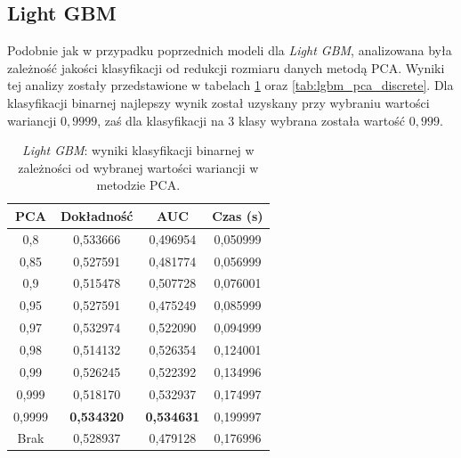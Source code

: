 \documentclass[a4paper, twoside, 11pt, openright]{article}
\begin{document}
\subsection{Light GBM}

Podobnie jak w przypadku poprzednich modeli dla \textit{Light GBM}, analizowana była zależność jakości klasyfikacji od redukcji rozmiaru danych metodą PCA. Wyniki tej analizy zostały przedstawione w tabelach \ref{tab:lgbm_pca_binary} oraz \ref{tab:lgbm_pca_discrete}. Dla klasyfikacji binarnej najlepszy wynik został uzyskany przy wybraniu wartości wariancji $0,9999$, zaś dla klasyfikacji na 3 klasy wybrana została wartość $0,999$.

\begin{table}[H]
    \centering
    \begin{tabular}{|c|c|c|c|}
    \hline
        \textbf{PCA} & \textbf{Dokładność} & \textbf{AUC} & \textbf{Czas (s)} \\ \hline
0,8                &  0,533666 &  0,496954 &    0,050999 \\ \hline
0,85               &  0,527591 &  0,481774 &    0,056999 \\ \hline
0,9                &  0,515478 &  0,507728 &    0,076001 \\ \hline
0,95               &  0,527591 &  0,475249 &    0,085999 \\ \hline
0,97               &  0,532974 &  0,522090 &    0,094999 \\ \hline
0,98               &  0,514132 &  0,526354 &    0,124001 \\ \hline
0,99               &  0,526245 &  0,522392 &    0,134996 \\ \hline
0,999			   &  0,518170 &  0,532937 &    0,174997 \\ \hline
0,9999             &  \textbf{0,534320} &  \textbf{0,534631} &    0,199997 \\ \hline
Brak                &  0,528937 &  0,479128 &    0,176996 \\ \hline
    \end{tabular}
    \caption{\textit{Light GBM}: wyniki klasyfikacji binarnej w zależności od wybranej wartości wariancji w metodzie PCA.}
    \label{tab:lgbm_pca_binary}
\end{table}
\end{document}
